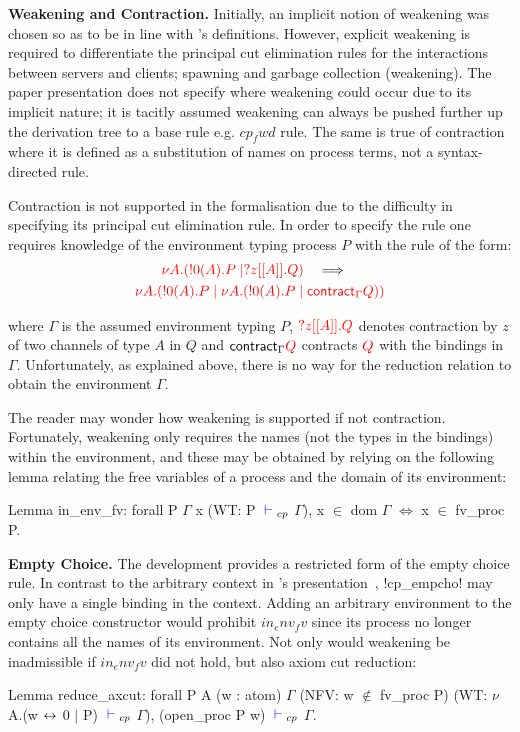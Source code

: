 \textbf{Weakening and Contraction.} Initially, an implicit notion of weakening
was chosen so as to be in line with \citeauthor{Wadler:2014}'s
definitions. However, explicit weakening is required to differentiate the
principal cut elimination rules for the interactions between servers and
clients; spawning and garbage collection (weakening). The paper presentation
does not specify where weakening could occur due to its implicit nature; it is
tacitly assumed weakening can always be pushed further up the derivation tree
to a base rule e.g. \coqe$cp_fwd$ rule. The same is true of contraction where
it is defined as a substitution of names on process terms, not a
syntax-directed rule.

\begin{samepage}
Contraction is not supported in the formalisation due to the difficulty in
specifying its principal cut elimination rule.  In order to specify the rule
one requires knowledge of the environment typing process \coqe$P$ with the
rule of the form:
\begin{gather*}
{\color{red}\nu A.(!0(A).P \mid ?z[[A]].Q)}
\quad \Longrightarrow \quad \\
{\color{red} \nu A.(!0(A).P \mid \nu A.(!0(A).P \mid \textsf{contract}_{\Gamma} Q))}
\end{gather*}

where $\Gamma$ is the assumed environment typing \coqe$P$, ${\color{red} ?z[[A]].Q}$
denotes contraction by $z$ of two channels of type $A$ in $Q$ and
$\textsf{contract}_{\Gamma} {\color{red} Q}$ contracts ${\color{red} Q}$ with the bindings in
$\Gamma$. Unfortunately, as explained above, there is no way for the reduction
relation to obtain the environment $\Gamma$.
\end{samepage}

The reader may wonder how weakening is supported if not
contraction. Fortunately, weakening only requires the names (not the types in
the bindings) within the environment, and these may be obtained by relying on
the following lemma relating the free variables of a process and the domain of
its environment:
\begin{coq}
Lemma in_env_fv:
  forall P $\Gamma$ x (WT: P ${\color{blue} {} \vdash {}}_{cp}$ $\Gamma$),
    x $\in$ dom $\Gamma$ $\iff$ x $\in$ fv_proc P.
\end{coq}

\textbf{Empty Choice.} The development provides a restricted form of the empty
choice rule. In contrast to the arbitrary context in
\citeauthor{Wadler:2014}'s presentation~\cite{Wadler:2014}, \coqe!cp_empcho!
may only have a single binding in the context. Adding an arbitrary environment
to the empty choice constructor would prohibit \coqe$in_env_fv$ since its
process no longer contains all the names of its environment. Not only would
weakening be inadmissible if \coqe$in_env_fv$ did not hold, but also axiom cut
reduction:
\begin{coq}
Lemma reduce_axcut:
  forall P A (w : atom) $\Gamma$
         (NFV: w $\notin$ fv_proc P)
         (WT: $\nu$ A.(w ${\leftrightarrow}$ 0 $\mid$ P) ${\color{blue} {} \vdash {}}_{cp}$ $\Gamma$),
    (open_proc P w) ${\color{blue} {} \vdash {}}_{cp}$ $\Gamma$.
\end{coq}

